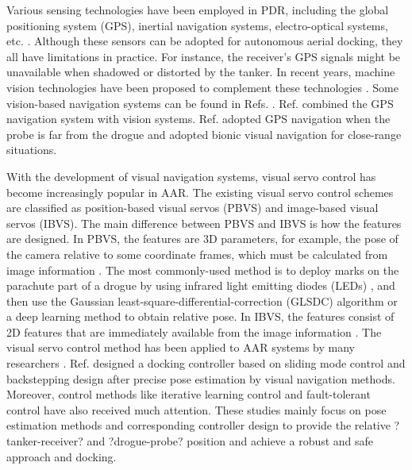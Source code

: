 Various sensing technologies have been employed in PDR, including the global positioning system (GPS), inertial navigation systems, electro-optical systems, etc. \cite{THOMAS201414,martinez2013vision}. Although these sensors can be adopted for autonomous aerial docking, they all have limitations in practice. For instance, the receiver's GPS signals might be unavailable when shadowed or distorted by the tanker. In recent years, machine vision technologies have been proposed to complement these technologies \cite{parry2023review}. Some vision-based navigation systems can be found in Refs. \cite{martinez2013vision,valasek2005vision,wang2015real}. Ref. \cite{campa2004autonomous} combined the GPS navigation system with vision systems.  Ref. \cite{sun2019bionic} adopted GPS navigation when the probe is far from the drogue and adopted bionic visual navigation for close-range situations. 


With the development of visual navigation systems, visual servo control has become increasingly popular in AAR. The existing visual servo control schemes are classified as position-based visual servos (PBVS) and image-based visual servos (IBVS). The main difference between PBVS and IBVS is how the features are designed.  
In PBVS, the features are 3D parameters, for example, the pose of the camera relative to some coordinate frames, which must be calculated from image information \cite{chaumette2006visual,chaumette2007visual,campa2009simulation}. The most commonly-used method is to deploy marks on the parachute part of a drogue by using infrared light emitting diodes (LEDs) \cite{wang2015real}, and then use the Gaussian least-square-differential-correction (GLSDC) algorithm \cite{valasek2005vision} or a deep learning method \cite{choi2021study,liu2018deep} to obtain relative pose. 
In IBVS, the features consist of 2D features that are immediately available from the image information \cite{chaumette2006visual}. 
The visual servo control method has been applied to AAR systems by many researchers \cite{sun2019bionic,tandale2006trajectory,duan2020bionic,valasek2017fault}. Ref. \cite{duan2020bionic} designed a docking controller based on sliding mode control and backstepping design after precise pose estimation by visual navigation methods. Moreover, control methods like iterative learning control \cite{dai2018terminal,ren2019reliable} and fault-tolerant control \cite{valasek2017fault} have also received much attention. These studies mainly focus on pose estimation methods and corresponding controller design to provide the relative ?tanker-receiver? and ?drogue-probe? position and achieve a robust and safe approach and docking. 



